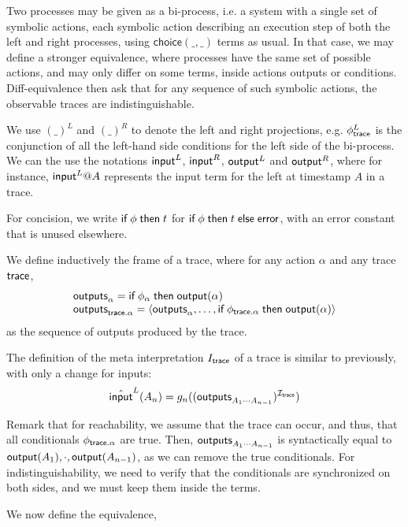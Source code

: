 \newcommand{\diff}[2]{\mathsf{choice}(#1,#2)}

Two processes may be given as a bi-process, i.e. a system with a single set of
symbolic actions, each symbolic action describing an execution step of both the
left and right processes, using $\diff{\_}{\_}$ terms as usual. In that case, we
may define a stronger equivalence, where processes have the same set of possible
actions, and may only differ on some terms, inside actions outputs or
conditions. Diff-equivalence then ask that for any sequence of such symbolic
actions, the observable traces are indistinguishable.

We
use $(\_)^L$ and $(\_)^R$ to denote the left and right projections,
e.g. $\phi_{\textsf{trace}}^L$ is the conjunction of all the left-hand side conditions for
the left side of the bi-process.  We can the use the notations $\textsf{input}^L$, $\textsf{input}^R$, $\textsf{output}^L$
and $\textsf{output}^R$, where for instance, $\textsf{input}^L@A$ represents the input term for
the left at timestamp $A$ in a trace.

For concision, we write $\textsf{if}\; \phi \;\textsf{then}\; t$ for
$\textsf{if}\; \phi \;\textsf{then}\; t \;\textsf{else}\; \mathsf{error}$, with an error constant that is
unused elsewhere.

\begin{definition}
  We define inductively the frame of a trace, where for any action $\alpha$ and any trace $\textsf{trace}$,
  \[\begin{array}{l}
     \textsf{outputs}_{\alpha} = \textsf{if}\; \phi_{\alpha} \;\textsf{then}\; \textsf{output}(\alpha) \\
     \textsf{outputs}_{\textsf{trace} . \alpha} = \langle \textsf{outputs}_\alpha,\dots, \textsf{if}\; \phi_{\textsf{trace} . \alpha} \;\textsf{then}\; \textsf{output}(\alpha) \rangle
     \end{array}\]
  as the sequence of outputs produced by the trace.
\end{definition}

The definition of the meta interpretation $I_{\textsf{trace}}$ of a trace is similar to previously, with only a change for inputs:
\[\hat{\textsf{input}}^L(A_n) = g_n( (\textsf{outputs}_{A_1\cdots A_{n-1}})^{\mathcal{I}_{\textsf{trace}}})\]

  Remark that for reachability, we assume that the trace can occur, and thus,
  that all conditionals $\phi_{\textsf{trace} . \alpha}$ are true. Then,
  $\textsf{outputs}_{A_1\cdots A_{n-1}}$ is syntactically equal to
    $\textsf{output}(A_1),\cdot,\textsf{output}(A_{n-1})$, as we can remove the true
    conditionals. For indistinguishability, we need to verify that the
    conditionals are synchronized on both sides, and we must keep them inside
    the terms.

We now define the equivalence,


